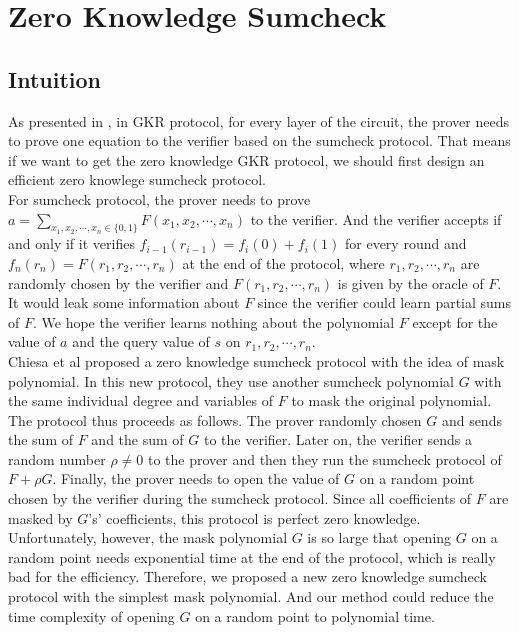 

\section{Zero Knowledge Sumcheck}\label{ZKSumcheck}
\subsection{Intuition}
As presented in , in GKR protocol\cite{GKR}, for every layer of the circuit, the prover needs to prove one equation to the verifier based on the sumcheck protocol. That means if we want to get the zero knowledge GKR protocol, we should first design an efficient zero knowlege sumcheck protocol.\\

For sumcheck protocol, the prover needs to prove $a = \sum\limits_{x_1, x_2, \cdots, x_n \in \{0, 1\}}F(x_1, x_2, \cdots, x_n)$ to the verifier. And the verifier accepts if and only if it verifies $f_{i-1}(r_{i-1}) = f_i(0) + f_i(1)$ for every round and $f_n(r_n) = F(r_1, r_2, \cdots, r_n)$ at the end of the protocol, where $r_1, r_2, \cdots, r_n$ are randomly chosen by the verifier and $F(r_1, r_2, \cdots, r_n)$ is given by the oracle of $F$. It would leak some information about $F$ since the verifier could learn partial sums of $F$. We hope the verifier learns nothing about the polynomial $F$ except for the value of $a$ and the query value of $s$ on $r_1, r_2, \cdots, r_n$.\\

Chiesa et al\cite{zksumcheck} proposed a zero knowledge sumcheck protocol with the idea of mask polynomial. In this new protocol, they use another sumcheck polynomial $G$ with the same individual degree and variables of $F$ to mask the original polynomial. The protocol thus proceeds as follows. The prover randomly chosen $G$ and sends the sum of $F$ and the sum of $G$ to the verifier. Later on, the verifier sends a random number $\rho \neq 0$ to the prover and then they run the sumcheck protocol of $F + \rho G$. Finally, the prover needs to open the value of $G$ on a random point chosen by the verifier during the sumcheck protocol. Since all coefficients of $F$ are masked by $G$'s' coefficients, this protocol is perfect zero knowledge.\\

Unfortunately, however, the mask polynomial $G$ is so large that opening $G$ on a random point needs exponential time at the end of the protocol, which is really bad for the efficiency. Therefore, we proposed a new zero knowledge sumcheck protocol with the simplest mask polynomial. And our method could reduce the time complexity of opening $G$ on a random point to polynomial time.\\

